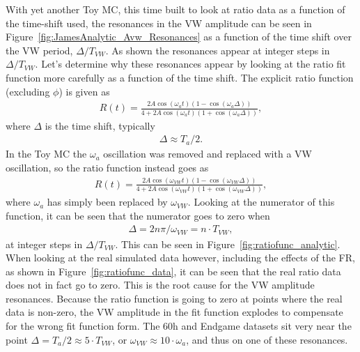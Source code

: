 \documentclass[12pt,letterpaper]{article}
\newcommand{\figref}[1]{Figure~\ref{#1}}
\def\wa{$\omega_{a}$\xspace}
\begin{document}
With yet another Toy MC, this time built to look at ratio data as a function of the time-shift used, the resonances in the VW amplitude can be seen in \figref{fig:JamesAnalytic_Avw_Resonances} as a function of the time shift over the VW period, $\Delta/T_{VW}$. As shown the resonances appear at integer steps in $\Delta/T_{VW}$. Let's determine why these resonances appear by looking at the ratio fit function more carefully as a function of the time shift. The explicit ratio function (excluding $\phi$) is given as \cite{60hReport}
    \begin{align}
        R(t) = \frac{2 A \cos(\omega_{a}t) (1 - \cos{(\omega_{a}\Delta)})} {4 + 2A \cos(\omega_{a}t) (1 + \cos{(\omega_{a}\Delta)} )},
    \end{align}
where $\Delta$ is the time shift, typically 
    \begin{align}
        \Delta \approx T_{a}/2.
    \end{align}
In the Toy MC the \wa oscillation was removed and replaced with a VW oscillation, so the ratio function instead goes as 
    \begin{align}
        R(t) = \frac{2 A \cos(\omega_{VW}t) (1 - \cos{(\omega_{VW}\Delta)})} {4 + 2A \cos(\omega_{VW}t) (1 + \cos{(\omega_{VW}\Delta)} )},
    \end{align}
where \wa has simply been replaced by $\omega_{VW}$. Looking at the numerator of this function, it can be seen that the numerator goes to zero when 
    \begin{align}
        \Delta = 2n\pi/\omega_{VW} = n \cdot T_{VW},
    \end{align}
at integer steps in $\Delta/T_{VW}$. This can be seen in \figref{fig:ratiofunc_analytic}. When looking at the real simulated data however, including the effects of the FR, as shown in \figref{fig:ratiofunc_data}, it can be seen that the real ratio data does not in fact go to zero. This is the root cause for the VW amplitude resonances. Because the ratio function is going to zero at points where the real data is non-zero, the VW amplitude in the fit function explodes to compensate for the wrong fit function form. The 60h and Endgame datasets sit very near the point $\Delta = T_{a}/2 \approx 5 \cdot T_{VW}$, or $\omega_{VW} \approx 10 \cdot \omega_{a}$, and thus on one of these resonances.
\end{document}
